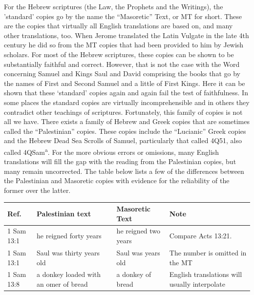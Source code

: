 {For the Hebrew scriptures (the Law, the Prophets and the Writings),
the 'standard' copies go by the name the ``Masoretic'' Text, or MT for
short. These are the copies that virtually all English translations
are based on, and many other translations, too. When Jerome translated
the Latin Vulgate in the late 4th century he did so from the MT copies that had been provided to him by Jewish scholars. For most of the Hebrew scriptures, these copies can be shown to be substantially faithful and correct. However, that is not the case with the Word concerning
Samuel and Kings Saul and David comprising the books that go by the names of First and Second Samuel and a little of First Kings. Here it can be shown that these
`standard' copies again and again fail the test of faithfulness. In some places the standard copies are virtually incomprehensible and in others they contradict other teachings of scriptures.
Fortunately, this family of copies is not all we have. There exists a
family of Hebrew and Greek copies that are sometimes called the
``Palestinian'' copies. These copies include the ``Lucianic'' Greek copies and the
Hebrew Dead Sea Scrolls of Samuel, particularly that called 4Q51, also
called 4QSam\textsuperscript{a}. For the more obvious errors or
omissions, many English translations will fill the gap with the
reading from the Palestinian copies, but many remain uncorrected. The table below lists a few of the
differences between the Palestinian and Masoretic copies with evidence
for the reliability of the former over the latter.
\begin{tabular}{p{}p{}p{}p{}}\hline
  Ref.& Palestinian text& Masoretic Text&Note\\\hline
  1 Sam 13:1&he reigned forty years&he reigned two years&Compare
                                                          Acts
                                                          13:21.\\
  1 Sam 13:1&Saul was thirty years old&Saul was years old&The number
                                                           is omitted
                                                           in the MT\\
  1 Sam 13:8&a donkey loaded with an omer of bread&a donkey of
                                                    bread&English
                                                           translations
                                                           will
                                                           usually
                                                           interpolate

\end{tabular}}
